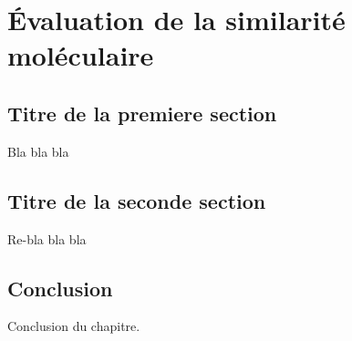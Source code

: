 \chapter{Évaluation de la similarité moléculaire}
\label{chap4}
\section{Titre de la premiere section}
Bla bla bla
\section{Titre de la seconde section}
Re-bla bla bla

\section{Conclusion}
Conclusion du chapitre.